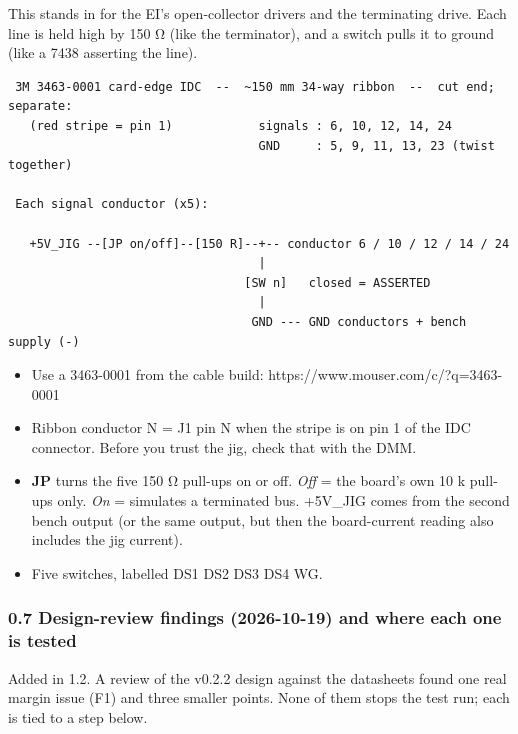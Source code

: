 \documentclass[
  10pt,
  twoside]{article}
\providecommand{\tightlist}{%
  \setlength{\itemsep}{0pt}\setlength{\parskip}{0pt}}
\begin{document}
This stands in for the EI's open-collector drivers and the
terminating drive. Each line is held high by 150 Ω (like the
terminator), and a switch pulls it to ground (like a 7438
asserting the line).

\begin{verbatim}
 3M 3463-0001 card-edge IDC  --  ~150 mm 34-way ribbon  --  cut end; separate:
   (red stripe = pin 1)            signals : 6, 10, 12, 14, 24
                                   GND     : 5, 9, 11, 13, 23 (twist together)

 Each signal conductor (x5):

   +5V_JIG --[JP on/off]--[150 R]--+-- conductor 6 / 10 / 12 / 14 / 24
                                   |
                                 [SW n]   closed = ASSERTED
                                   |
                                  GND --- GND conductors + bench supply (-)
\end{verbatim}

\begin{itemize}
\tightlist
\item
  Use a 3463-0001 from the cable build:
  https://www.mouser.com/c/?q=3463-0001
\item
  Ribbon conductor N = J1 pin N when the stripe is on pin 1
  of the IDC connector. Before you trust the jig, check that
  with the DMM.
\item
  \textbf{JP} turns the five 150 Ω pull-ups on or off.
  \emph{Off} = the board's own 10 k pull-ups only. \emph{On}
  = simulates a terminated bus. +5V\_JIG comes from the
  second bench output (or the same output, but then the
  board-current reading also includes the jig current).
\item
  Five switches, labelled DS1 DS2 DS3 DS4 WG.
\end{itemize}

\clearpage
\hypertarget{design-review-findings-2026-10-19-and-where-each-one-is-tested}{%
\subsubsection{0.7 Design-review findings (2026-10-19) and
where each one is
tested}\label{design-review-findings-2026-10-19-and-where-each-one-is-tested}}

\textcolor[HTML]{0040A0}{Added in 1.2. A review of the
v0.2.2 design against the datasheets found one real margin
issue (F1) and three smaller points. None of them stops the
test run; each is tied to a step below.}
\end{document}
